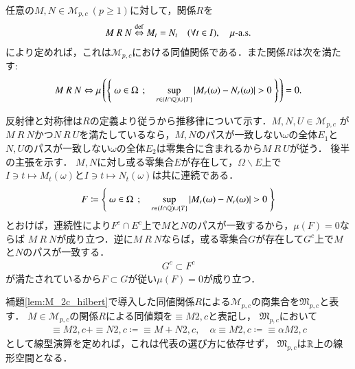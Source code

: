 	\begin{screen}
		\begin{lem}
			任意の$M,N \in \mathcal{M}_{p,c}\ (p \geq 1)$に対して，関係$R$を
			\begin{align}
				M\ R\ N \overset{\mathrm{def}}{\Leftrightarrow} M_t = N_t \quad (\forall t \in I),\quad \mbox{$\mu$-a.s.}
			\end{align}
			により定めれば，これは$\mathcal{M}_{p,c}$における同値関係である．また関係$R$は次を満たす:
			\begin{align}
				M\ R\ N \Leftrightarrow \mu\left( \left\{\ \omega \in \Omega\ \, ; \quad \operatorname*{sup}_{r \in (I \cap \mathbb{Q}) \cup \{ T \}} \left|M_r(\omega) - N_r(\omega)\right| > 0\ \right\}\right) = 0.
			\end{align}
			\label{lem:M_2c_hilbert}
		\end{lem}
	\end{screen}
	
	\begin{prf}
		反射律と対称律は$R$の定義より従うから推移律について示す．$M,N,U \in \mathcal{M}_{p,c}$
		が$M\ R\ N$かつ$N\ R\ U$を満たしているなら，$M,N$のパスが一致しない$\omega$の全体$E_1$と
		$N,U$のパスが一致しない$\omega$の全体$E_2$は零集合に含まれるから$M\ R\ U$が従う．
		後半の主張を示す．
		$M,N$に対し或る零集合$E$が存在して，$\Omega \backslash E$上で
		$I \ni t \longmapsto M_t(\omega)$と$I \ni t \longmapsto N_t(\omega)$は共に連続である．
		\begin{align}
			F \coloneqq \left\{\ \omega \in \Omega\ \, ; \quad \operatorname*{sup}_{r \in (I \cap \mathbb{Q}) \cup \{ T \}} \left|M_r(\omega) - N_r(\omega)\right| > 0\ \right\}
		\end{align}
		とおけば，連続性により$F^c \cap E^c$上で$M$と$N$のパスが一致するから，$\mu(F) = 0$ならば
		$M\ R\ N$が成り立つ．逆に$M\ R\ N$ならば，或る零集合$G$が存在して$G^c$上で$M$と$N$のパスが一致する．
		\begin{align}
			G^c \subset F^c
		\end{align}
		が満たされているから$F \subset G$が従い$\mu(F) = 0$が成り立つ．
		\QED
	\end{prf}
	
	\begin{screen}
		\begin{dfn}
			補題\ref{lem:M_2c_hilbert}で導入した同値関係$R$による$\mathcal{M}_{p,c}$の商集合を$\mathfrak{M}_{p,c}$と表す．
			$M \in \mathcal{M}_{p,c}$の関係$R$による同値類を$\equiv{M}{2,c}$と表記し，
			$\mathfrak{M}_{p,c}$において
			\begin{align}
				\equiv{M}{2,c} + \equiv{N}{2,c} \coloneqq \equiv{M+N}{2,c}, 
				\quad \alpha \equiv{M}{2,c} \coloneqq \equiv{\alpha M}{2,c} \label{eq:mart_linear_arithmetic}
			\end{align}
			として線型演算を定めれば，これは代表の選び方に依存せず，
			$\mathfrak{M}_{p,c}$は$\mathbb{R}$上の線形空間となる．
		\end{dfn}
	\end{screen}
	
